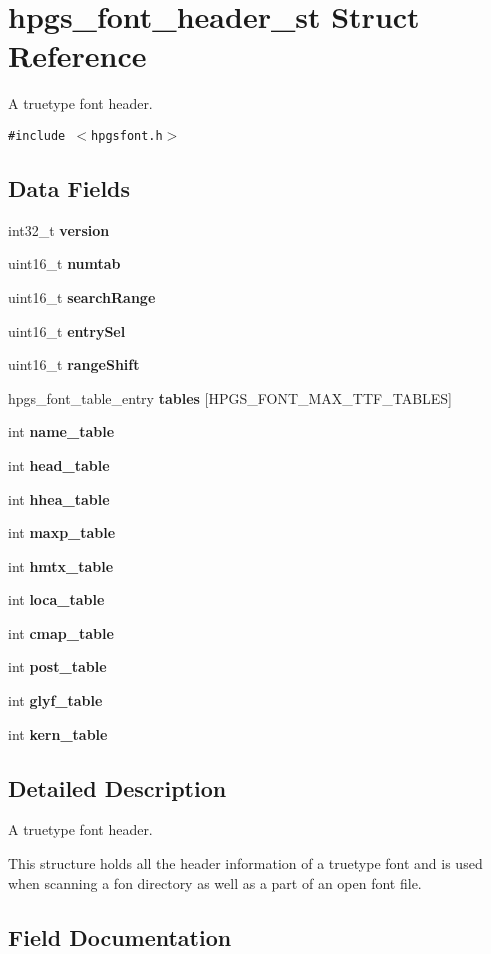 \section{hpgs\_\-font\_\-header\_\-st Struct Reference}
\label{structhpgs__font__header__st}
A truetype font header.  


{\tt \#include $<$hpgsfont.h$>$}

\subsection*{Data Fields}
\begin{CompactItemize}
\item 
int32\_\-t {\bf version}
\item 
uint16\_\-t {\bf numtab}
\item 
uint16\_\-t {\bf searchRange}
\item 
uint16\_\-t {\bf entrySel}
\item 
uint16\_\-t {\bf rangeShift}
\item 
hpgs\_\-font\_\-table\_\-entry {\bf tables} [HPGS\_\-FONT\_\-MAX\_\-TTF\_\-TABLES]
\item 
int {\bf name\_\-table}
\item 
int {\bf head\_\-table}
\item 
int {\bf hhea\_\-table}
\item 
int {\bf maxp\_\-table}
\item 
int {\bf hmtx\_\-table}
\item 
int {\bf loca\_\-table}
\item 
int {\bf cmap\_\-table}
\item 
int {\bf post\_\-table}
\item 
int {\bf glyf\_\-table}
\item 
int {\bf kern\_\-table}
\end{CompactItemize}


\subsection{Detailed Description}
A truetype font header. 

This structure holds all the header information of a truetype font and is used when scanning a fon directory as well as a part of an open font file. 

\subsection{Field Documentation}
